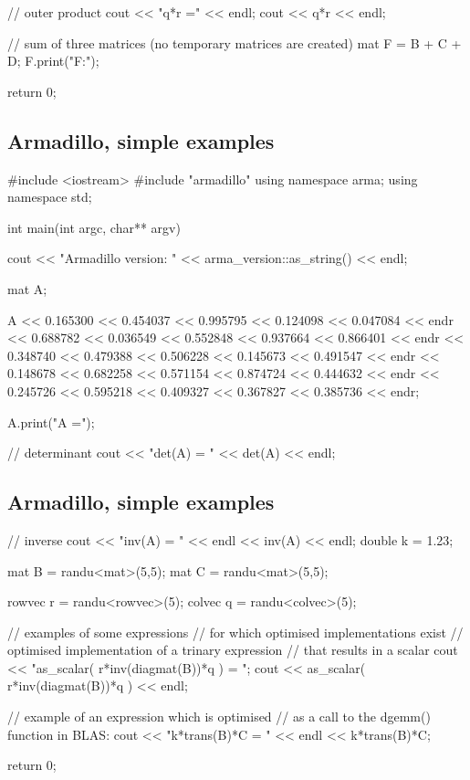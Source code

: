 \documentclass[%
twoside,                 %
final,                   %
10pt]{article}
\begin{document}
{    // outer product
  cout << "q*r =" << endl;
  cout << q*r << endl;


  // sum of three matrices (no temporary matrices are created)
  mat F = B + C + D;
  F.print("F:");

    return 0;

\ecppcod

\subsection{Armadillo, simple examples}

\bcppcod
#include <iostream>
#include "armadillo"
using namespace arma;
using namespace std;

int main(int argc, char** argv)
  {
  cout << "Armadillo version: " << arma_version::as_string() << endl;

  mat A;

  A << 0.165300 << 0.454037 << 0.995795 << 0.124098 << 0.047084 << endr
    << 0.688782 << 0.036549 << 0.552848 << 0.937664 << 0.866401 << endr
    << 0.348740 << 0.479388 << 0.506228 << 0.145673 << 0.491547 << endr
    << 0.148678 << 0.682258 << 0.571154 << 0.874724 << 0.444632 << endr
    << 0.245726 << 0.595218 << 0.409327 << 0.367827 << 0.385736 << endr;

  A.print("A =");

  // determinant
  cout << "det(A) = " << det(A) << endl;
\ecppcod

\subsection{Armadillo, simple examples}

\bcppcod
  // inverse
  cout << "inv(A) = " << endl << inv(A) << endl;
  double k = 1.23;

  mat    B = randu<mat>(5,5);
  mat    C = randu<mat>(5,5);

  rowvec r = randu<rowvec>(5);
  colvec q = randu<colvec>(5);


  // examples of some expressions
  // for which optimised implementations exist
  // optimised implementation of a trinary expression
  // that results in a scalar
  cout << "as_scalar( r*inv(diagmat(B))*q ) = ";
  cout << as_scalar( r*inv(diagmat(B))*q ) << endl;

  // example of an expression which is optimised
  // as a call to the dgemm() function in BLAS:
  cout << "k*trans(B)*C = " << endl << k*trans(B)*C;

    return 0;

}}
\end{document}
